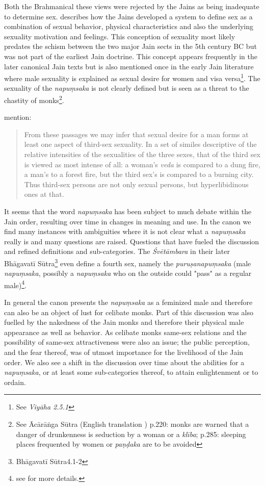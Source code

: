 Both the Brahmanical these views were rejected by the Jains as being inadequate to determine sex. \cite{dundas} describes how the Jains developed a system to define sex as a combination of sexual behavior, physical characteristics and also the underlying sexuality motivation and feelings. This conception of sexuality most likely predates the schism between the two major Jain sects in the 5th century BC but was not part of the earliest Jain doctrine. This concept appears frequently in the later canonical Jain texts but is also mentioned once in the early Jain literature where male sexuality is explained as sexual desire for women and visa versa\footnote{See {\em Viyāha 2.5.1}}. The sexuality of the {\em napuṃsaka} is not clearly defined but is seen as a threat to the chastity of monks\footnote{See Ācārāṅga Sūtra (English translation \cite{jacobi}) p.220: monks are warned that a danger of drunkenness is seduction by a woman or a {\em klība}; p.285: sleeping places frequented by women or {\em paṇḍaka} are to be avoided}.

\cite{zwilling} mention:

\begin{quote}
From these passages we may infer that sexual desire for a man forms at least one aspect of third-sex sexuality. In a set of similes descriptive of the relative intensities of the sexualities of the three sexes, that of the third sex is viewed as most intense of all: a woman's {\em veda} is compared to a dung fire, a man's to a forest fire, but the third sex's is compared to a burning city. Thus third-sex persons are not only sexual persons, but hyperlibidinous ones at that.
\end{quote}

It seems that the word {\em napuṃsaka} has been subject to much debate within the Jain order, resulting over time in changes in meaning and use. In the canon we find many instances with ambiguities where it is not clear what a {\em napuṃsaka} really is and many questions are raised. Questions that have fueled the discussion and refined definitions and sub-categories. The {\em Śvētāmbara} in their later Bhāgavatī Sūtra\footnote{Bhāgavatī Sūtra4.1-2} even define a fourth sex, namely the {\em puruṣanapuṃsaka} (male {\em napuṃsaka}, possibly a {\em napuṃsaka} who on the outside could "pass" as a regular male)\footnote{see \cite{zwilling} for more details.}. 

In general the canon presents the {\em napuṃsaka} as a feminized male and therefore can also be an object of lust for celibate monks. Part of this discussion was also fuelled by the nakedness of the Jain monks and therefore their physical male appearance as well as behavior. As celibate monks same-sex relations and the possibility of same-sex attractiveness were also an issue; the public perception, and the fear thereof, was of utmost importance for the livelihood of the Jain order. We also see a shift in the discussion over time about the abilities for a {\em napuṃsaka}, or at least some sub-categories thereof, to attain enlightenment or to ordain.

